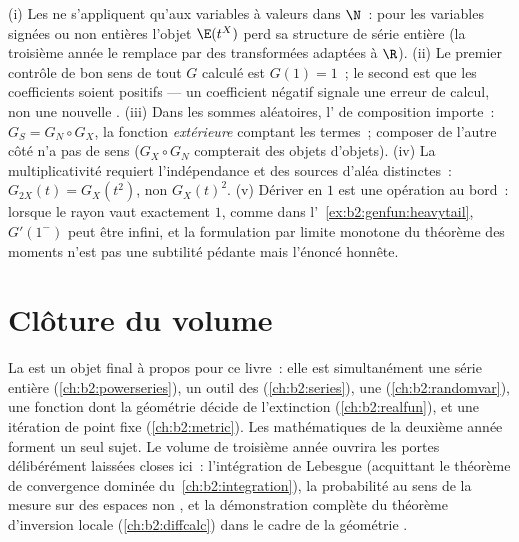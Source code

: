 \begin{remark}
(i) Les  ne s'appliquent qu'aux variables à
valeurs dans $\N$~: pour les variables signées ou non entières l'objet
$\E(t^X)$ perd sa structure de série entière (la troisième année le
remplace par des transformées adaptées à $\R$). (ii) Le premier
contrôle de bon sens de tout $G$ calculé est $G(1) = 1$~; le second
est que les coefficients soient positifs --- un coefficient négatif
signale une erreur de calcul, non une nouvelle . (iii) Dans les
sommes aléatoires, l' de composition importe~: $G_S = G_N \circ
G_X$, la fonction \emph{extérieure} comptant les termes~; composer de
l'autre côté n'a pas de sens ($G_X \circ G_N$ compterait des objets
d'objets). (iv) La multiplicativité requiert l'indépendance et des
sources d'aléa distinctes~: $G_{2X}(t) = G_X(t^2)$, non $G_X(t)^2$.
(v) Dériver en $1$ est une opération au bord~: lorsque le rayon vaut
exactement $1$, comme dans l'~\cref{ex:b2:genfun:heavytail},
$G'(1^-)$ peut être infini, et la formulation par limite monotone du
théorème des moments n'est pas une subtilité pédante mais l'énoncé
honnête.
\end{remark}

\section*{Clôture du volume}

La  est un objet final à propos pour ce livre~:
elle est simultanément une série entière (\cref{ch:b2:powerseries}), un
outil des  (\cref{ch:b2:series}), une 
(\cref{ch:b2:randomvar}), une fonction  dont la géométrie décide
de l'extinction (\cref{ch:b2:realfun}), et une itération de point fixe
(\cref{ch:b2:metric}). Les mathématiques de la deuxième année forment
un seul sujet. Le volume de troisième année ouvrira les portes
délibérément laissées closes ici~: l'intégration de Lebesgue
(acquittant le théorème de convergence dominée du~\cref{ch:b2:integration}),
la probabilité au sens de la mesure sur des espaces non ,
et la démonstration complète du théorème d'inversion locale
(\cref{ch:b2:diffcalc}) dans le cadre de la géométrie .


